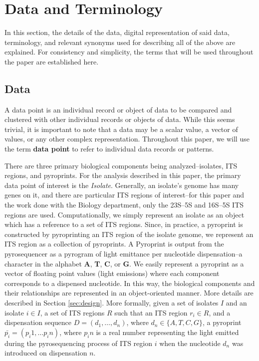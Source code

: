 \documentclass[12pt]{ucthesis}
\begin{document}
   \section{Data and Terminology}\label{sec:data_and_terms}
      In this section, the details of the data, digital representation of said
      data, terminology, and relevant synonyms used for describing all of the
      above are explained. For consistency and simplicity, the terms that will
      be used throughout the paper are established here.

      \subsection{Data}
      A data point is an individual record or object of data to be compared
      and clustered with other individual records or objects of data. While
      this seems trivial, it is important to note that a data may be a scalar
      value, a vector of values, or any other complex representation.
      Throughout this paper, we will use the term \textbf{data point} to refer
      to individual data records or patterns.

      There are three primary biological components being analyzed--isolates,
      ITS regions, and pyroprints. For the analysis described in this paper,
      the primary data point of interest is the \textit{Isolate}. Generally,
      an isolate's genome has many genes on it, and there are particular
      ITS regions of interest--for this paper and the work done with the
      Biology department, only the 23S--5S and 16S--5S ITS regions are used.
      Computationally, we simply represent an isolate as an object
      which has a reference to a set of ITS regions. Since, in practice, a
      pyroprint is constructed by pyroprinting an ITS region of the isolate
      genome, we represent an ITS region as a collection of pyroprints. A
      Pyroprint is output from the pyrosequencer as a pyrogram of light
      emittance per nucleotide dispensation--a character in the alphabet
      \textbf{A}, \textbf{T}, \textbf{C}, or \textbf{G}. We easily represent a
      pyroprint as a vector of floating point values (light emissions) where
      each component corresponds to a dispensed nucleotide. In this way, the
      biological components and their relationships are represented in an
      object-oriented manner. More details are described in Section
      \ref{sec:design}. More formally, given a set of isolates $I$ and an
      isolate $i \in I$, a set of ITS regions $R$ such that an ITS region $r_i
      \in R$, and a dispensation sequence $D = (d_1, \ldots, d_n)$, where $d_n
      \in \{A, T, C, G\}$, a pyroprint $\bar{p_i} = (p_i1,\ldots p_in)$, where
      $p_in$ is a real number representing the light emitted during the
      pyrosequencing process of ITS region $i$ when the nucleotide $d_n$ was
      introduced on dispensation $n$.
      
\end{document}
